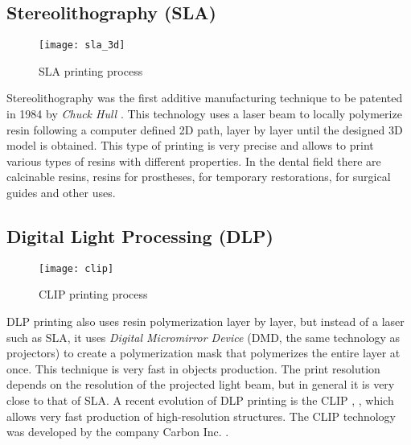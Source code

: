 \subsection{Stereolithography (SLA)}

\begin{wrapfigure} {R} {0.37\textwidth}
\vspace{-40pt}
	\begin{center}
	\texttt{[image: sla\_3d]}
    \caption{SLA printing process}
    \label{fig:sla_3d}
    \end{center}
\vspace{-40pt}
\end{wrapfigure}

Stereolithography was the first additive manufacturing technique to be patented in 1984 by \emph{Chuck Hull} \parencite{Reference124}. This technology uses a laser beam to locally polymerize resin following a computer defined 2D path, layer by layer until the designed 3D model is obtained. This type of printing is very precise and allows to print various types of resins with different properties. In the dental field there are calcinable resins, resins for prostheses, for temporary restorations, for surgical guides and other uses.

\subsection{Digital Light Processing (DLP)}

\begin{wrapfigure} {R} {0.37\textwidth}
\vspace{-40pt}
	\begin{center}
	\texttt{[image: clip]}
    \caption{CLIP printing process}
    \label{fig:clip}
    \end{center}
\vspace{-20pt}
\end{wrapfigure}

DLP printing also uses resin polymerization layer by layer, but instead of a laser such as SLA, it uses \emph{Digital Micromirror Device} (DMD, the same technology as projectors) to create a polymerization mask that polymerizes the entire layer at once. This technique is very fast in objects production. The print resolution depends on the resolution of the projected light beam, but in general it is very close to that of SLA. A recent evolution of DLP printing is the CLIP \parencite{Reference121}, \parencite{Reference122}, which allows very fast production of high-resolution structures. The CLIP technology was developed by the company Carbon Inc. \parencite{Reference123}.

